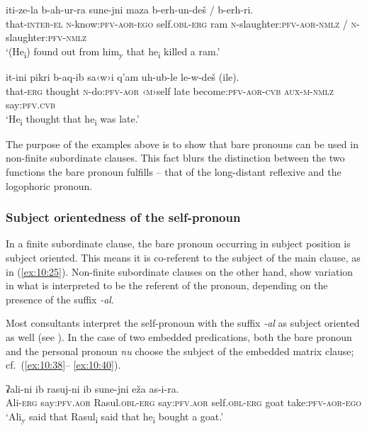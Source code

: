 ﻿\documentclass[output=paper]{langsci/langscibook}
\begin{document}
\ex \label{ex:10:36} %
\gll  iti-ze-la b-ah-ur-ra sune-jni maza b-erh-un-deš \textup/ b-erh-ri.\\
that-\textsc{inter}-\textsc{el} \textsc{n}-know:\textsc{pfv}-\textsc{aor}-\textsc{ego} self.\textsc{obl}-\textsc{erg} ram \textsc{n}-slaughter:\textsc{pfv}-\textsc{aor}-\textsc{nmlz} / \textsc{n}-slaughter:\textsc{pfv}-\textsc{nmlz}\\ 
\glt `(He\textsubscript{i}) found out from him\textsubscript{y} that
he\textsubscript{i} killed a ram.'

\pagebreak[4]

\ex \label{ex:10:37} %
\gll  it-ini pikri b-aq-ib sa‹w›i q'am uh-ub-le le-w-deš (ile).\\ 
that-\textsc{erg} thought \textsc{n}-do:\textsc{pfv}-\textsc{aor} ‹\textsc{m}›self late become:\textsc{pfv}-\textsc{aor}-\textsc{cvb} \textsc{aux}-\textsc{m}-\textsc{nmlz} say:\textsc{pfv}.\textsc{cvb}\\ 
\glt `He\textsubscript{i} thought that he\textsubscript{i} was late.'
\z


The purpose of the examples above is to show that bare pronouns can be
used in non-finite subordinate clauses. This fact blurs the distinction
between the two functions the bare pronoun fulfills – that of the
long-distant reflexive and the logophoric pronoun.

\subsubsection{Subject orientedness of the self-pronoun}


In a finite subordinate clause, the bare pronoun occurring in subject
position is subject oriented. This means it is co-referent to the
subject of the main clause, as in (\ref{ex:10:25}). Non-finite subordinate clauses
on the other hand, show variation in what is interpreted to be the
referent of the pronoun, depending on the presence of the suffix
\emph{-al}.

Most consultants interpret the self-pronoun with the suffix \emph{-al}
as subject oriented as well (see ). In the case of two
embedded predications, both the bare pronoun and the personal pronoun
\emph{nu} choose the subject of the embedded matrix clause; cf.\ (\ref{ex:10:38}–%
\ref{ex:10:40}).

\ea \label{ex:10:38} %
\gll  ʡali-ni ib rasuj-ni ib sune-jni eža as-i-ra.\\
Ali-\textsc{erg} say:\textsc{pfv}.\textsc{aor} Rasul.\textsc{obl}-\textsc{erg} say:\textsc{pfv}.\textsc{aor} self.\textsc{obl}-\textsc{erg} goat take:\textsc{pfv}-\textsc{aor}-\textsc{ego}\\ 
\glt `Ali\textsubscript{y} said that Rasul\textsubscript{i} said that
he\textsubscript{i} bought a goat.'
\end{document}

